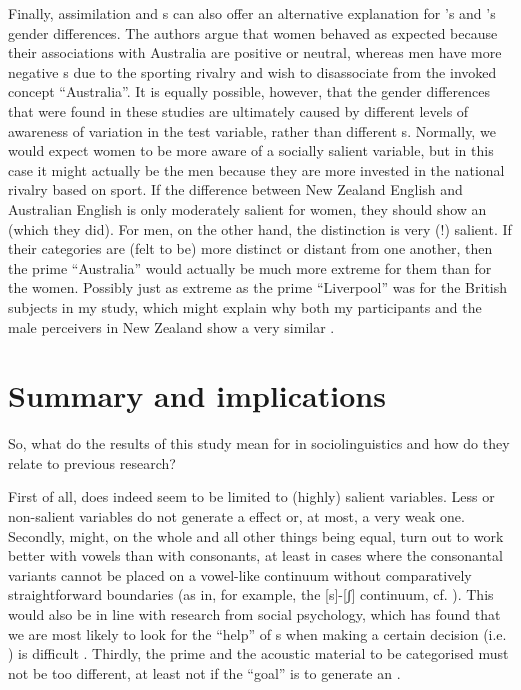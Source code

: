 Finally, assimilation and s can also offer an alternative explanation for \textcite{hayetal2006a}'s and \textcite{haydrager2010}'s gender differences.
The authors argue that women behaved as expected because their associations with Australia are positive or neutral, whereas men have more negative s due to the sporting rivalry and wish to disassociate from the invoked concept ``Australia''.
It is equally possible, however, that the gender differences that were found in these studies are ultimately caused by different levels of awareness of variation in the test variable, rather than different s.
Normally, we would expect women to be more aware of a socially salient variable, but in this case it might actually be the men because they are more invested in the national rivalry based on sport.
If the difference between New Zealand English and Australian English is only moderately salient for women, they should show an  (which they did).
For men, on the other hand, the distinction is very (!) salient.
If their categories are (felt to be) more distinct or distant from one another, then the prime ``Australia'' would actually be much more extreme for them than for the women.
Possibly just as extreme as the prime ``Liverpool'' was for the British subjects in my study, which might explain why both my participants and the male perceivers in New Zealand show a very similar .

	\section{Summary and implications}

So, what do the results of this study mean for   in sociolinguistics and how do they relate to previous research?

First of all,  does indeed seem to be limited to (highly) salient variables.
Less or non-salient variables do not generate a  effect or, at most, a very weak one.
Secondly,  might, on the whole and all other things being equal, turn out to work better with vowels than with consonants, at least in cases where the consonantal variants cannot be placed on a vowel-like continuum without comparatively straightforward boundaries (as in, for example, the [s]-[ʃ] continuum, cf. \citealt{strand1999}).
This would also be in line with research from social psychology, which has found that we are most likely to look for the ``help'' of s when making a certain decision (i.e. ) is difficult \parencite[cf.][28]{petersensix2008}.
Thirdly, the prime and the acoustic material to be categorised must not be too different, at least not if the ``goal'' is to generate an .

